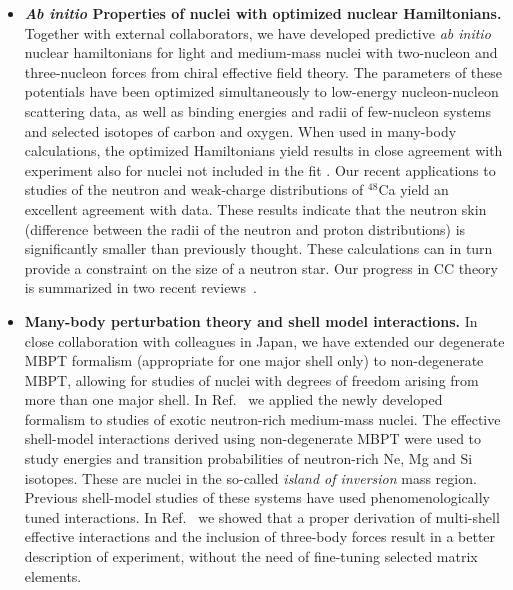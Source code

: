 \begin{itemize}
\item {\bf \emph{Ab initio} Properties of nuclei with optimized
    nuclear Hamiltonians.}  Together with external collaborators, we have developed predictive
  {\em ab initio} nuclear hamiltonians for light and medium-mass
  nuclei with two-nucleon and three-nucleon forces from chiral
  effective field theory.  The parameters of these potentials have
  been optimized simultaneously to low-energy nucleon-nucleon
  scattering data, as well as binding energies and radii of
  few-nucleon systems and selected isotopes of carbon and
  oxygen. When used in many-body calculations, the optimized Hamiltonians yield results in close agreement with
  experiment also for nuclei not included in the fit
  \cite{Ekstrom:2015rta,Ekstrom:2013kea,Ekstrom:2014dxa}. Our recent
  applications to studies of the neutron and weak-charge distributions
  of $^{48}$Ca \cite{Hagen:2015yea} yield an excellent agreement with data. These results indicate that the neutron skin
  (difference between the radii of the neutron and proton
  distributions) is significantly smaller than previously
  thought. These calculations can in turn provide a constraint on the
  size of a neutron star.  Our progress in CC theory is
  summarized in two recent reviews~\cite{Hagen:2014ve,Hagen:2016xjv}.



\item {\bf Many-body perturbation theory and shell model
    interactions.}  In close collaboration with colleagues in Japan,
  we have extended our degenerate MBPT formalism (appropriate for one
  major shell only) to non-degenerate MBPT, allowing for studies of
  nuclei with degrees of freedom arising from more than one major
  shell.  In Ref.~\cite{Tsunoda:2016fjh} we applied the newly developed
  formalism to studies of exotic neutron-rich medium-mass nuclei.  The
  effective shell-model interactions derived using non-degenerate MBPT
  \cite {Tsunoda:2016fjh,Tsunoda:2013bla} were used to study
  energies and transition probabilities of neutron-rich Ne, Mg and Si
  isotopes. These are nuclei in the so-called {\em island of
    inversion} mass region. Previous shell-model studies of these systems
  have used phenomenologically tuned interactions. In
  Ref.~\cite{Tsunoda:2016fjh} we showed that a proper derivation of
  multi-shell effective interactions and the inclusion of three-body
  forces result in a better description of experiment, without the
  need of fine-tuning selected matrix elements.



\end{itemize}
